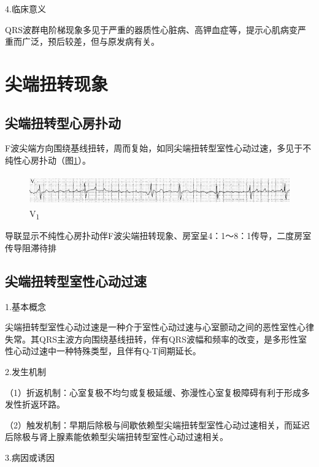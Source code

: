 4.临床意义

QRS波群电阶梯现象多见于严重的器质性心脏病、高钾血症等，提示心肌病变严重而广泛，预后较差，但与原发病有关。

\protect\hypertarget{text00046.htmlux5cux23subid518}{}{}

\section{尖端扭转现象}

\protect\hypertarget{text00046.htmlux5cux23subid519}{}{}

\subsection{尖端扭转型心房扑动}

F波尖端方向围绕基线扭转，周而复始，如同尖端扭转型室性心动过速，多见于不纯性心房扑动（图\ref{fig39-10}）。

\begin{figure}[!htbp]
 \centering
 \includegraphics[width=5.58333in,height=0.51042in]{./images/Image00659.jpg}
 \captionsetup{justification=centering}
 \caption{V\textsubscript{1}}
 \label{fig39-10}
  \end{figure} 
导联显示不纯性心房扑动伴F波尖端扭转现象、房室呈4：1～8：1传导，二度房室传导阻滞待排

\protect\hypertarget{text00046.htmlux5cux23subid520}{}{}

\subsection{尖端扭转型室性心动过速}

1.基本概念

尖端扭转型室性心动过速是一种介于室性心动过速与心室颤动之间的恶性室性心律失常。其QRS主波方向围绕基线扭转，伴有QRS波幅和频率的改变，是多形性室性心动过速中一种特殊类型，且伴有Q-T间期延长。

2.发生机制

（1）折返机制：心室复极不均匀或复极延缓、弥漫性心室复极障碍有利于形成多发性折返环路。

（2）触发机制：早期后除极与间歇依赖型尖端扭转型室性心动过速相关，而延迟后除极与肾上腺素能依赖型尖端扭转型室性心动过速相关。

3.病因或诱因


